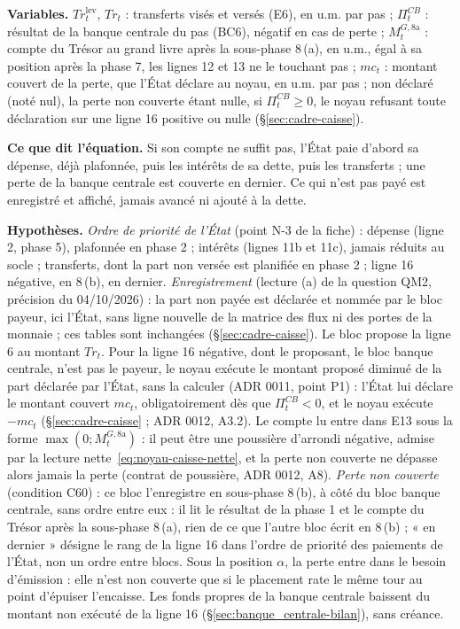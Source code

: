 \documentclass[11pt,a4paper]{article}
\newcommand{\variables}{\par\noindent\textbf{Variables.} }
\newcommand{\sens}{\par\noindent\textbf{Ce que dit l'équation.} }
\newcommand{\hyp}{\par\noindent\textbf{Hypothèses.} }
\begin{document}
\begin{proposee}
\variables $\mathit{Tr}^{\mathrm{lev}}_t$, $\mathit{Tr}_t$ : transferts visés et versés (E6), en u.m. par pas ; $\Pi^{\mathit{CB}}_t$ : résultat de la banque centrale du pas (BC6), négatif en cas de perte ; $M^{G,8\mathrm{a}}_t$ : compte du Trésor au grand livre après la sous-phase 8\,(a), en u.m., égal à sa position après la phase 7, les lignes 12 et 13 ne le touchant pas ; $\mathit{mc}_t$ : montant couvert de la perte, que l'État déclare au noyau, en u.m. par pas ; non déclaré (noté nul), la perte non couverte étant nulle, si $\Pi^{\mathit{CB}}_t \ge 0$, le noyau refusant toute déclaration sur une ligne 16 positive ou nulle (\S\ref{sec:cadre-caisse}).
\sens Si son compte ne suffit pas, l'État paie d'abord sa dépense, déjà plafonnée, puis les intérêts de sa dette, puis les transferts ; une perte de la banque centrale est couverte en dernier. Ce qui n'est pas payé est enregistré et affiché, jamais avancé ni ajouté à la dette.
\hyp \emph{Ordre de priorité de l'État} (point N-3 de la fiche) : dépense (ligne 2, phase 5), plafonnée en phase 2 ; intérêts (lignes 11b et 11c), jamais réduits au socle ; transferts, dont la part non versée est planifiée en phase 2 ; ligne 16 négative, en 8\,(b), en dernier. \emph{Enregistrement} (lecture (a) de la question QM2, précision du 04/10/2026) : la part non payée est déclarée et nommée par le bloc payeur, ici l'État, sans ligne nouvelle de la matrice des flux ni des portes de la monnaie ; ces tables sont inchangées (\S\ref{sec:cadre-caisse}). Le bloc propose la ligne 6 au montant $\mathit{Tr}_t$. Pour la ligne 16 négative, dont le proposant, le bloc banque centrale, n'est pas le payeur, le noyau exécute le montant proposé diminué de la part déclarée par l'État, sans la calculer (ADR 0011, point P1) : l'État lui déclare le montant couvert $\mathit{mc}_t$, obligatoirement dès que $\Pi^{\mathit{CB}}_t < 0$, et le noyau exécute $-\mathit{mc}_t$ (\S\ref{sec:cadre-caisse} ; ADR 0012, A3.2). Le compte lu entre dans E13 sous la forme $\max(0 ; M^{G,8\mathrm{a}}_t)$ : il peut être une poussière d'arrondi négative, admise par la lecture nette~\eqref{eq:noyau-caisse-nette}, et la perte non couverte ne dépasse alors jamais la perte (contrat de poussière, ADR 0012, A8). \emph{Perte non couverte} (condition C60) : ce bloc l'enregistre en sous-phase 8\,(b), à côté du bloc banque centrale, sans ordre entre eux : il lit le résultat de la phase 1 et le compte du Trésor après la sous-phase 8\,(a), rien de ce que l'autre bloc écrit en 8\,(b) ; « en dernier » désigne le rang de la ligne 16 dans l'ordre de priorité des paiements de l'État, non un ordre entre blocs. Sous la position $\alpha$, la perte entre dans le besoin d'émission : elle n'est non couverte que si le placement rate le même tour au point d'épuiser l'encaisse. Les fonds propres de la banque centrale baissent du montant non exécuté de la ligne 16 (\S\ref{sec:banque_centrale-bilan}), sans créance.

\end{proposee}
\end{document}
